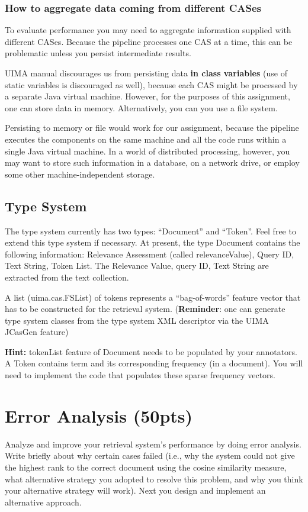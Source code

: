 \documentclass[oneside,11pt]{memoir}
\begin{document}
\subsection{How to aggregate data coming from different CASes} 
To evaluate performance you may need to aggregate information
supplied with different CASes.
Because the pipeline processes one CAS at a time,
this can be problematic unless you persist intermediate results.

UIMA manual discourages us from persisting data \textbf{in class variables} (use 
of static variables is discouraged as well),
because each CAS might be processed by a separate Java virtual machine.
However, for the purposes of this assignment, one can store data in memory.
Alternatively, you can you use a file system.

Persisting to memory or file would work for our assignment, 
because the pipeline executes the components on the same machine 
and all the code runs within a single Java virtual machine.
In a world of distributed processing, however, you may want to store such information in a database,
on a network drive, or employ some other machine-independent storage.


\section{Type System}\label{SectionType}
The type system currently has two types: ``Document'' and ``Token''.
Feel free to extend this type system if necessary.
At present, the type Document contains the following information: Relevance Assessment (called relevanceValue), Query ID, Text String, Token
List. The Relevance Value, query ID, Text String are extracted from the text collection. 

A list (uima.cas.FSList) of tokens 
represents a ``bag-of-words'' feature vector
that has to be constructed for the retrieval system. (\textbf{Reminder}:
one can generate type system classes from the type system XML descriptor via the UIMA JCasGen feature)

\textbf{Hint:} tokenList feature of Document needs to be populated by your annotators. 
A Token contains term and its corresponding frequency (in a document). 
You will need to implement the code that populates these sparse frequency vectors.

\chapter{Error Analysis (50pts)}
\label{SectionError}
Analyze and improve your retrieval system's performance by doing error analysis. Write briefly about
why certain cases failed (i.e., why the system could not give the highest rank to the correct document
using the cosine similarity measure, what alternative strategy you adopted to resolve this problem, and
why you think your alternative strategy will work). Next you design and implement an alternative
approach.
\end{document}
